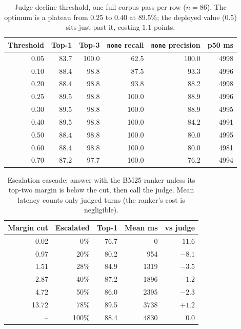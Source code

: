 \begin{table}[t]\centering\small
\caption{Judge decline threshold, one full corpus pass per row ($n=86$). The optimum is a plateau from
$0.25$ to $0.40$ at $89.5\%$; the deployed value ($0.5$) sits just past it, costing $1.1$ points.}
\label{tab:routing-sweep}
\begin{tabular}{rrrrrr}
\toprule
Threshold & Top-1 & Top-3 & \texttt{none} recall & \texttt{none} precision & p50 ms \\
\midrule
0.05 & 83.7 & 100.0 & 62.5  & 100.0 & 4998 \\
0.10 & 88.4 & 98.8  & 87.5  & 93.3  & 4996 \\
0.20 & 88.4 & 98.8  & 93.8  & 88.2  & 4998 \\
0.25 & 89.5 & 98.8  & 100.0 & 88.9  & 4996 \\
0.30 & 89.5 & 98.8  & 100.0 & 88.9  & 4995 \\
0.40 & 89.5 & 98.8  & 100.0 & 84.2  & 4991 \\
0.50 & 88.4 & 98.8  & 100.0 & 80.0  & 4995 \\
0.60 & 88.4 & 98.8  & 100.0 & 80.0  & 4981 \\
0.70 & 87.2 & 97.7  & 100.0 & 76.2  & 4994 \\
\bottomrule
\end{tabular}
\end{table}

\begin{table}[t]\centering\small
\caption{Escalation cascade: answer with the BM25 ranker unless its top-two margin is below the cut,
then call the judge. Mean latency counts only judged turns (the ranker's cost is negligible).}
\label{tab:routing-cascade}
\begin{tabular}{rrrrr}
\toprule
Margin cut & Escalated & Top-1 & Mean ms & vs judge \\
\midrule
0.02  & 0\%   & 76.7 & 0    & $-11.6$ \\
0.97  & 20\%  & 80.2 & 954  & $-8.1$  \\
1.51  & 28\%  & 84.9 & 1319 & $-3.5$  \\
2.87  & 40\%  & 87.2 & 1896 & $-1.2$  \\
4.72  & 50\%  & 86.0 & 2395 & $-2.3$  \\
13.72 & 78\%  & 89.5 & 3738 & $+1.2$  \\
--    & 100\% & 88.4 & 4830 & $0.0$   \\
\bottomrule
\end{tabular}
\end{table}

